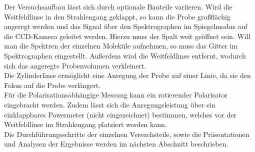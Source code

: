 Der Versuchsaufbau lässt sich durch optionale Bauteile variieren.
Wird die Weitfeldlinse in den Strahlengang geklappt, so kann die Probe großflächig angeregt werden und das
Signal über den Spektrographen im Spiegelmodus auf die CCD-Kamera geleitet werden. Hierzu muss der
Spalt weit geöffnet sein. Will man die Spektren der einzelnen Moleküle aufnehmen, so muss das Gitter
im Spektrographen eingestellt. Außerdem wird die Weitfeldlinse entfernt, wodurch
sich das angeregte Probenvolumen verkleinert. \\
Die Zylinderlinse ermöglicht eine Anregung der Probe auf einer Linie, da sie den Fokus auf die Probe
verlängert. \\
Für die Polarisationsabhängige Messung kann ein rotierender Polarisator eingebracht werden. Zudem lässt sich
die Anregungsleistung über ein einklappbares Powermeter (nicht eingezeichnet) bestimmen, welches
vor der Weitfeldlinse im Strahlengang platziert werden kann. \\
Die Durchführungsschritte der einzelnen Versuchsteile, sowie die Präsentationen und Analysen der
Ergebnisse werden im nächsten Abschnitt beschrieben. \\


